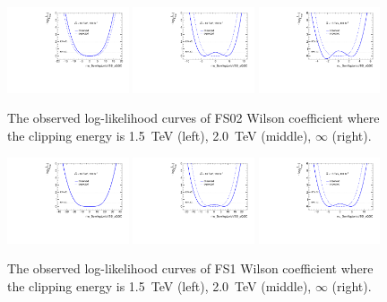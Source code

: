 \begin{figure}[ht]
    \centering
    \includegraphics[width=0.32\textwidth]{figures/aQGC/profileFS021500}
    	\includegraphics[width=0.32\textwidth]{figures/aQGC/profileFS022000}
        \includegraphics[width=0.32\textwidth]{figures/aQGC/profileFS02inf}
        \caption{The observed log-likelihood curves of FS02 Wilson coefficient where the clipping energy is 1.5~TeV (left), 2.0~TeV (middle), $\infty$ (right).}
        \label{fig:ProfileLL}
\end{figure}
\begin{figure}[ht]
    \centering
    \includegraphics[width=0.32\textwidth]{figures/aQGC/profileFS11500}
    	\includegraphics[width=0.32\textwidth]{figures/aQGC/profileFS12000}
        \includegraphics[width=0.32\textwidth]{figures/aQGC/profileFS1inf}
        \caption{The observed log-likelihood curves of FS1 Wilson coefficient where the clipping energy is 1.5~TeV (left), 2.0~TeV (middle), $\infty$ (right).}
        \label{fig:ProfileLL}
\end{figure}

